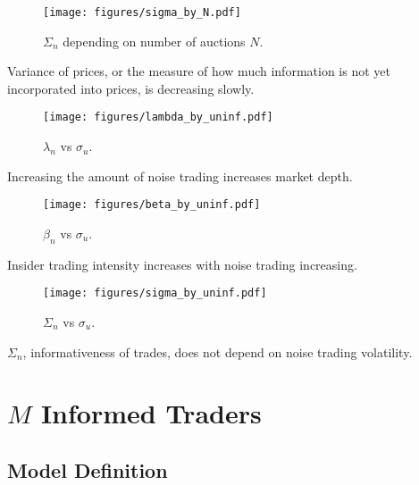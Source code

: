 \documentclass{beamer}
\begin{document}
\begin{frame}
    \begin{figure}\label{fig:sigma_on_N}
        \texttt{[image: figures/sigma\_by\_N.pdf]}
        \caption{$\Sigma_n$ depending on number of auctions $N$.}

    \end{figure}

    Variance of prices, or the measure of how much information is not yet incorporated into prices, is decreasing slowly.
\end{frame}

\begin{frame}
    \begin{figure}\label{fig:lambda_on_uninf}
        \texttt{[image: figures/lambda\_by\_uninf.pdf]}
        \caption{$\lambda_n$ vs $\sigma_u$.}
    \end{figure}

    Increasing the amount of noise trading increases market depth.
\end{frame}

\begin{frame}
    \begin{figure}\label{fig:beta_on_uninf}
        \texttt{[image: figures/beta\_by\_uninf.pdf]}
        \caption{$\beta_n$ vs $\sigma_u$.}
    \end{figure}

    Insider trading intensity increases with noise trading increasing.
\end{frame}

\begin{frame}
    \begin{figure}\label{fig:sigma_on_uninf}
        \texttt{[image: figures/sigma\_by\_uninf.pdf]}
        \caption{$\Sigma_n$ vs $\sigma_u$.}
    \end{figure}

    $\Sigma_n$, informativeness of trades, does not depend on noise trading volatility.
\end{frame}

\section{$M$ Informed Traders}

\subsection{Model Definition}
\end{document}
